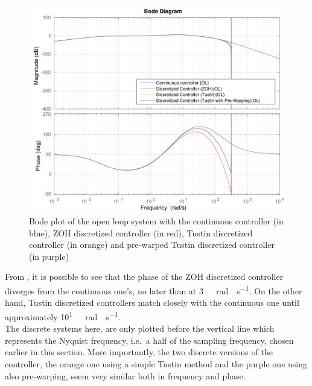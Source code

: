 \begin{figure}[H]
  \centering
  \includegraphics[scale=.6]{figures/zohVsPrewarpVsNoPrewarpVsContinuousBodeOpenLoop.pdf}
  \caption{Bode plot of the open loop system with the continuous controller (in blue), ZOH discretized controller (in red), Tustin discretized controller (in orange) and pre-warped Tustin discretized controller (in purple)}
  \label{fig:bodePrewarpVsNoPrewarpVsContinuousOpenLoop}
\end{figure}
%
From , it is possible to see that the phase of the ZOH discretized controller diverges from the continuous one's, no later than at \si{3\ rad \cdot s^{-1}}. On the other hand, Tustin discretized controllers match closely with the continuous one until approximately \si{10^{1}\ rad \cdot s^{-1}}. \\
The discrete systems here, are only plotted before the vertical line which represents the Nyquist frequency, i.e.~a half of the sampling frequency, chosen earlier in this section. More importantly, the two discrete versions of the controller, the orange one using a simple Tustin method and the purple one using also pre-warping, seem very similar both in frequency and phase.
%
